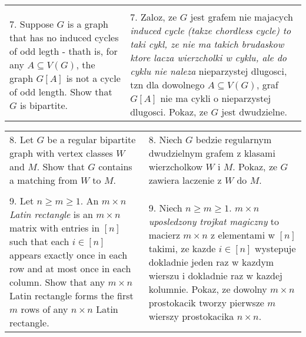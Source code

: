 \documentclass{article}[13pt]
\begin{document}
\begin{tabularx}{\textwidth}{ X X }
         & \\

        7. Suppose $G$ is a graph that has no induced cycles of odd legth - thath is, for any $A\subseteq V(G)$, the graph $G[A]$ is not a cycle of odd length. Show that $G$ is bipartite. & 7. Zaloz, ze $G$ jest grafem nie majacych \emph{induced cycle (takze chordless cycle) to taki cykl, ze nie ma takich brudaskow ktore lacza wierzcholki w cyklu, ale do cyklu nie naleza} nieparzystej dlugosci, tzn dla dowolnego $A\subseteq V(G)$, graf $G[A]$ nie ma cykli o nieparzystej dlugosci. Pokaz, ze $G$ jest dwudzielne.
    \end{tabularx}

    \begin{tabularx}{\textwidth}{ X X }
        8. Let $G$ be a regular bipartite graph with vertex classes $W$ and $M$. Show that $G$ contains a matching from $W$ to $M$. & 8. Niech $G$ bedzie regularnym dwudzielnym grafem z klasami wierzcholkow $W$ i $M$. Pokaz, ze $G$ zawiera laczenie z $W$ do $M$.\\

         & \\
        
        9. Let $n\geq m\geq1$. An $m\times n$ \emph{Latin rectangle} is an $m\times n$ matrix with entries in $[n]$ such that each $i\in[n]$ appears exactly once in each row and at most once in each column. Show that any $m\times n$ Latin rectangle forms the first $m$ rows of any $n\times n$ Latin rectangle. & 9. Niech $n\geq m\geq1$. $m\times n$ \emph{uposledzony trojkat magiczny} to macierz $m\times n$ z elementami w $[n]$ takimi, ze kazde $i\in [n]$ wystepuje dokladnie jeden raz w kazdym wierszu i dokladnie raz w kazdej kolumnie. Pokaz, ze dowolny $m\times n$ prostokacik tworzy pierwsze $m$ wierszy prostokacika $n\times n$.
    \end{tabularx}
\end{document}
